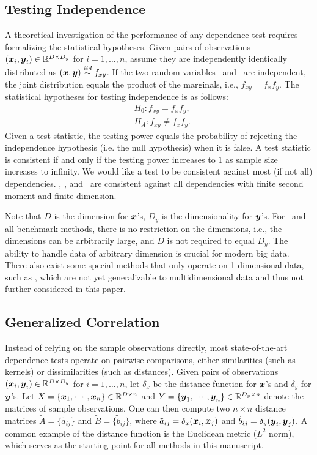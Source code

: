 \documentclass[11pt]{article}
\begin{document}
\subsection{Testing Independence}

A theoretical investigation of the performance of any dependence test requires formalizing the statistical hypotheses.
 Given pairs of observations $(\boldsymbol{x}_{i},\boldsymbol{y}_{i}) \in \mathbb{R}^{D \times D_y}$ for $i=1,\ldots,n$, assume they are independently identically distributed as $(\boldsymbol{x},\boldsymbol{y}) \overset{iid}{\sim} f_{xy}$. If the two random variables \mbx~and \mby~are independent, the joint distribution equals the product of the marginals, i.e., $f_{xy}=f_x f_y$.  The statistical hypotheses for testing independence is as follows:
\begin{align*}
& H_{0}: f_{xy}=f_{x}f_{y},\\
& H_{A}: f_{xy} \neq f_{x}f_{y}.
\end{align*}
Given a test statistic, the testing power equals the probability of rejecting the independence hypothesis (i.e. the null hypothesis) when it is false. A test statistic is consistent if and only if the testing power increases to $1$ as sample size increases to infinity. We would like a test to be consistent against most (if not all) dependencies. \Dcorr, \Mcorr, and \Hhg~are consistent against all dependencies with finite second moment and finite dimension.

Note that $D$ is the dimension for $\boldsymbol{x}$'s, $D_y$ is the dimensionality for $\boldsymbol{y}$'s. For \Mgc~and all benchmark methods, there is no restriction on the dimensions, i.e., the dimensions can be arbitrarily large, and $D$ is not required to equal $D_y$. The ability to handle data of arbitrary dimension is crucial for modern big data. There also exist some special methods that only operate on 1-dimensional data, such as \cite{Reshef2011,heller2016consistent,Huo2016}, which are not yet generalizable to multidimensional data and thus not further considered in this paper.

\subsection{Generalized Correlation}
Instead of relying on the sample observations directly, most state-of-the-art dependence tests operate on pairwise comparisons, either similarities (such as kernels) or dissimilarities (such as distances). 
Given pairs of observations $(\boldsymbol{x}_{i},\boldsymbol{y}_{i}) \in \mathbb{R}^{D \times D_y}$ for $i=1,\ldots,n$, let $\delta_x$ be the distance function for $\boldsymbol{x}$'s and $\delta_y$ for $\boldsymbol{y}$'s. 
Let $X=\{\boldsymbol{x}_{1},\cdots, \boldsymbol{x}_{n}\} \in \mathbb{R}^{D \times n}$ and $Y=\{\boldsymbol{y}_{1},\cdots, \boldsymbol{y}_{n}\} \in \mathbb{R}^{D_y \times n}$ denote the matrices of sample observations.
One can then compute two $n \times n$ distance matrices $\tilde{A}=\{\tilde{a}_{ij}\}$ and $\tilde{B}=\{\tilde{b}_{ij}\}$, where $\tilde{a}_{ij}=\delta_x(\boldsymbol{x}_i,\boldsymbol{x}_j)$ and $\tilde{b}_{ij}=\delta_y(\boldsymbol{y}_i,\boldsymbol{y}_j)$. A common example of the distance function is the Euclidean metric ($L^{2}$ norm), which serves as the starting point for all methods in this manuscript.
\end{document}
